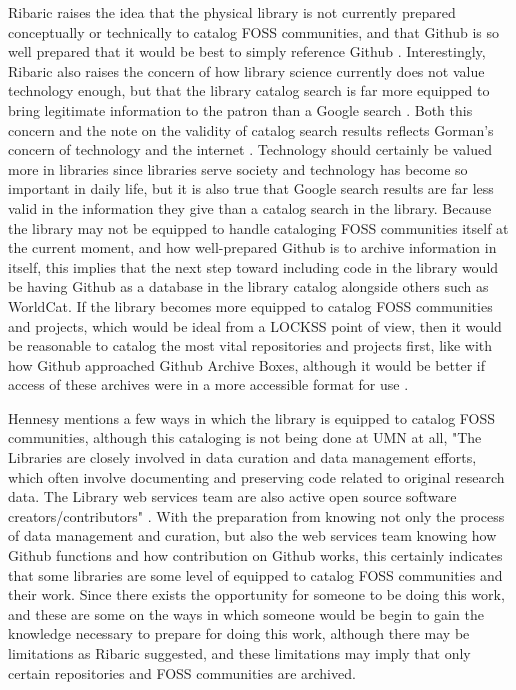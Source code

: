 Ribaric raises the idea that the physical library is not currently prepared conceptually or technically to catalog FOSS communities, and that Github is so well prepared that it would be best to simply reference Github \cite{timinterview}. Interestingly, Ribaric also raises the concern of how library science currently does not value technology enough, but that the library catalog search is far more equipped to bring legitimate information to the patron than a Google search \cite{timinterview}. Both this concern and the note on the validity of catalog search results reflects Gorman's concern of technology and the internet \cite{gorman2000values}. Technology should certainly be valued more in libraries since libraries serve society and technology has become so important in daily life, but it is also true that Google search results are far less valid in the information they give than a catalog search in the library. Because the library may not be equipped to handle cataloging FOSS communities itself at the current moment, and how well-prepared Github is to archive information in itself, this implies that the next step toward including code in the library would be having Github as a database in the library catalog alongside others such as WorldCat. If the library becomes more equipped to catalog FOSS communities and projects, which would be ideal from a LOCKSS point of view, then it would be reasonable to catalog the most vital repositories and projects first, like with how Github approached Github Archive Boxes, although it would be better if access of these archives were in a more accessible format for use \cite{githubarchiveboxes}. 

Hennesy mentions a few ways in which the library is equipped to catalog FOSS communities, although this cataloging is not being done at UMN at all, "The Libraries are closely involved in data curation and data management efforts, which often involve documenting and preserving code related to original research data. The Library web services team are also active open source software creators/contributors" \cite{codyinterview}. With the preparation from knowing not only the process of data management and curation, but also the web services team knowing how Github functions and how contribution on Github works, this certainly indicates that some libraries are some level of equipped to catalog FOSS communities and their work.
Since there exists the opportunity for someone to be doing this work, and these are some on the ways in which someone would be begin to gain the knowledge necessary to prepare for doing this work, although there may be limitations as Ribaric suggested, and these limitations may imply that only certain repositories and FOSS communities are archived. 

